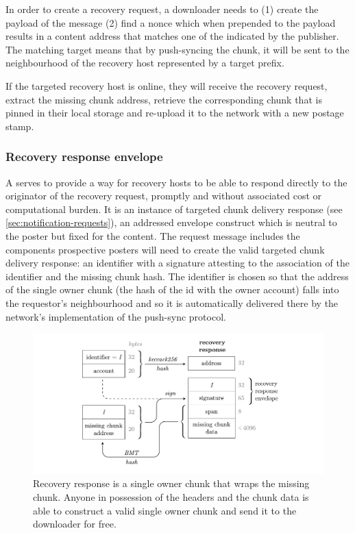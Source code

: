 In order to create a recovery request, a downloader needs to (1) create the payload of the message (2) find a nonce which when prepended to the payload results in a content address that matches one of the  indicated by the publisher. The matching target means that by push-syncing the chunk, it will be sent to the neighbourhood of the recovery host represented by a target prefix. 

If the targeted recovery host is online, they will receive the recovery request, extract the missing chunk address, retrieve the corresponding chunk that is pinned in their local storage and re-upload it to the network with a new postage stamp.

\subsubsection{Recovery response envelope}

A  serves to provide a way for recovery hosts to be able to respond directly to the originator of the recovery request, promptly and without associated cost or computational burden. It is an instance of targeted chunk delivery response (see \ref{sec:notification-requests}), an addressed envelope construct which is neutral to the poster but fixed for the content. The request message includes the components prospective posters will need to create the valid targeted chunk delivery response: an identifier with a signature attesting to the association of the identifier and the missing chunk hash. The identifier is chosen so that the address of the single owner chunk (the hash of the id with the owner account) falls into the requestor's neighbourhood and so it is automatically delivered there by the network's implementation of the push-sync protocol.

\begin{figure}[htbp]
\centering
\includegraphics[width=\textwidth]{fig/recovery-response-2.pdf}
\caption[Recovery response \statusgreen]{Recovery response is a single owner chunk that wraps the missing chunk. Anyone in possession of the headers and the chunk data is able to construct a valid single owner chunk and send it to the downloader for free.}
\label{fig:recovery-response}
\end{figure}

